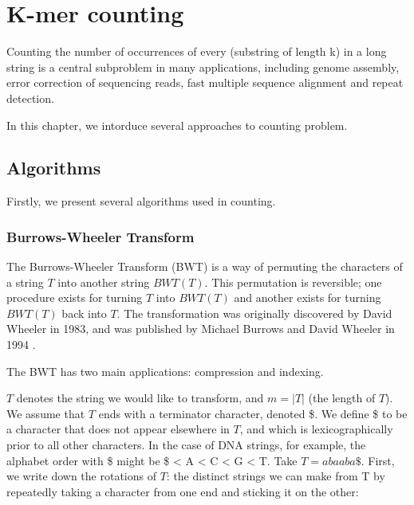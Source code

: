 \chapter{K-mer counting}


Counting the number of occurrences of every \kmer (substring of length k) in a long string is a central subproblem in many applications, including genome assembly, error correction of sequencing reads, fast multiple sequence alignment and repeat detection.

In this chapter, we intorduce several approaches to \kmer counting problem.

\section{Algorithms}

Firstly, we present several algorithms used in \kmer counting.

\subsection{Burrows-Wheeler Transform}

The Burrows-Wheeler Transform (BWT) is a way of permuting the characters of a string $T$ into
another string $BWT(T)$. This permutation is reversible; one procedure exists for turning $T$ into
$BWT(T)$ and another exists for turning $BWT(T)$ back into $T$. The transformation was originally
discovered by David Wheeler in 1983, and was published by Michael Burrows and David Wheeler
in 1994 \cite{burrows1994block}.

The BWT has two main applications: compression and indexing.
\cite{langmead2013bwt}

$T$ denotes the string we would like to transform, and $m = |T|$ (the length of $T$). We assume that $T$ ends with a terminator character, denoted \$. We define \$ to be a character that does not appear elsewhere in $T$, and which is lexicographically prior to all other characters. In the case of DNA
strings, for example, the alphabet order with \$ might be \$ < A < C < G < T.
Take $T = abaaba\$$. First, we write down the rotations of $T$: the distinct strings we can make from T by repeatedly taking a character from one end and sticking it on the other:

